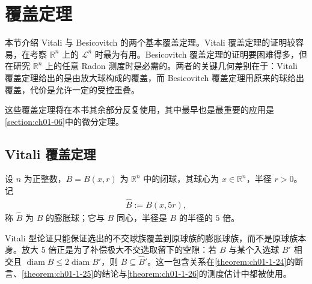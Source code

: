 \documentclass[../../main.tex]{subfiles}%
\begin{document}
\section{覆盖定理}\label{section:ch01-05}

本节介绍 Vitali 与 Besicovitch 的两个基本覆盖定理。Vitali 覆盖定理的证明较容易，在考察 $\mathbb{R}^n$ 上的 $\mathcal{L}^n$ 时最为有用。Besicovitch 覆盖定理的证明要困难得多，但在研究 $\mathbb{R}^n$ 上的任意 Radon 测度时是必需的。两者的关键几何差别在于：Vitali 覆盖定理给出的是由放大球构成的覆盖，而 Besicovitch 覆盖定理用原来的球给出覆盖，代价是允许一定的受控重叠。

这些覆盖定理将在本书其余部分反复使用，其中最早也是最重要的应用是\cref{section:ch01-06}中的微分定理。%

\subsection{Vitali 覆盖定理}\label{subsection:ch01-05-1}

\begin{definition*}[膨胀球]\label{definition:ch01-05-bhat}
设 $n$ 为正整数，$B=B(x,r)$ 为 $\mathbb{R}^n$ 中的闭球，其球心为 $x\in\mathbb{R}^n$，半径 $r>0$。记
\begin{align*}
\hat B:=B(x,5r),
\end{align*}
称 $\hat B$ 为 $B$ 的膨胀球；它与 $B$ 同心，半径是 $B$ 的半径的 $5$ 倍。
\end{definition*}

\begin{remark}\label{remark:ch01-05-bhat-动机}
Vitali 型论证只能保证选出的不交球族覆盖到原球族的膨胀球族，而不是原球族本身。放大 $5$ 倍正是为了补偿极大不交选取留下的空隙：若 $B$ 与某个入选球 $B'$ 相交且 $\operatorname{diam}B\leqslant2\operatorname{diam}B'$，则 $B\subseteq\hat B'$。这一包含关系在\cref{theorem:ch01-1-24}的断言、\cref{theorem:ch01-1-25}的结论与\cref{theorem:ch01-1-26}的测度估计中都被使用。%
\end{remark}
\end{document}
